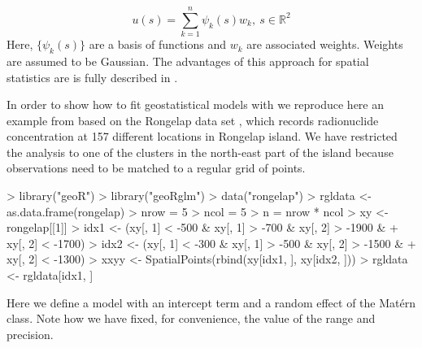 \documentclass[article]{jss}
\begin{document}
$$
u(s)=\sum_{k=1}^n \psi_k(s)w_k,\ s\in \mathbb{R}^2
$$
\noindent
Here, $\{\psi_k(s)\}$ are a basis of functions and $w_k$ are associated
weights. Weights are assumed to be Gaussian. The advantages of this approach
for spatial statistics are is fully described in \citet{Camelettietal:2013}.


In order to show how to fit geostatistical models with  we
reproduce here an example from \citet{GomezRubioetal:2013} based on the
Rongelap data set \citep{DiggleRibeiro:2007}, which records  radionuclide
concentration at 157 different locations in Rongelap island. We have restricted
the analysis to one of the clusters in the north-east part of the island
because observations need to be matched to a regular grid of points.

\begin{Schunk}
\begin{Sinput}
> library("geoR")
> library("geoRglm")
> data("rongelap")
> rgldata <- as.data.frame(rongelap)
> nrow = 5
> ncol = 5
> n = nrow * ncol
> xy <- rongelap[[1]]
> idx1 <- (xy[, 1] < -500 & xy[, 1] > -700 & xy[, 2] > -1900 & 
+     xy[, 2] < -1700)
> idx2 <- (xy[, 1] < -300 & xy[, 1] > -500 & xy[, 2] > -1500 & 
+     xy[, 2] < -1300)
> xxyy <- SpatialPoints(rbind(xy[idx1, ], xy[idx2, ]))
> rgldata <- rgldata[idx1, ]
\end{Sinput}
\end{Schunk}

\begin{Schunk}
\end{Schunk}


Here we define a model with an intercept term and a random effect of the
Mat\'ern class. Note how we have fixed, for convenience, 
the value of the range and precision.
\end{document}
